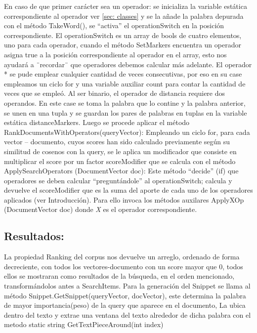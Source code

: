 \documentclass[a4paper,12pt]{article}
\begin{document}
En caso de que primer carácter sea un operador: se inicializa la variable estática
correspondiente al operador ver \ref{sec: classes} y se la añade la palabra depurada
con el método TakeWord(), se “activa” el operationSwitch en la posición correspondiente.
El operationSwitch es un array de bools de cuatro elementos, uno para cada operador, cuando
el método SetMarkers encuentra un operador asigna true a la posición correspondiente al
operador en el array, esto nos ayudará a ¨recordar¨ que operadores debemos calcular más
adelante.
El operador * se pude emplear cualquier cantidad de veces consecutivas, por eso en su case
empleamos un ciclo for y una variable auxiliar count para contar la cantidad de veces que se
empleó.
Al ser binario, el operador de distancia requiere dos operandos. En este case se toma la palabra
que lo contine y la palabra anterior, se unen en una tupla y se guardan los pares de palabras
en tuplas en la variable estática distanceMarkers.
Luego se procede aplicar el método RankDocumentsWithOperators(queryVector):
Empleando un ciclo for, para cada vector – documento, cuyos scores han sido calculado
previamente según su similitud de cosenos con la query, se le aplica un modificador que
consiste en multiplicar el score por un factor scoreModifier que se calcula con el método
ApplySearchOperators (DocumentVector doc):
Este método “decide” (if) que operadores se deben calcular “preguntándole” al operationSwitch;
calcula y devuelve el scoreModifier que es la suma del aporte de cada uno de los operadores
aplicados (ver Introducción). Para ello invoca los métodos auxilares ApplyXOp
(DocumentVector doc) donde \emph{X} es el operador correspondiente.
    
    
\subsection{Resultados:}    
La propiedad Ranking del corpus nos devuelve un arreglo, ordenado de forma decreciente, con
todos los vectores-documento con un score mayor que 0, todos ellos se mostraran como
resultados de la búsqueda, en el orden mencionado, transformándolos antes a SearchItems.
Para la generación del Snippet se llama al método Snippet.GetSnippet(queryVector, docVector),
este determina la palabra de mayor importancia(peso) de la query que aparece en el
documento, La ubica dentro del texto y extrae una ventana del texto alrededor de dicha palabra con el metodo static string GetTextPieceAround(int index) 
\end{document}
